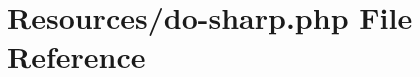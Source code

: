 \hypertarget{do-sharp_8php}{}\section{Resources/do-\/sharp.php File Reference}
\label{do-sharp_8php}
